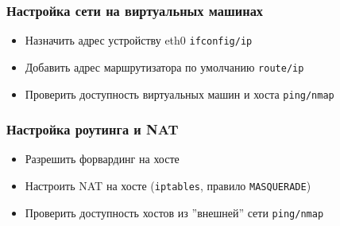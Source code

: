 \begin{frame}
	\frametitle{Настройка сети на виртуальных машинах}
			\begin{itemize}
				\item Назначить адрес устройству eth0 {\tt ifconfig/ip}
				\item Добавить адрес маршрутизатора по умолчанию {\tt route/ip}
				\item Проверить доступность виртуальных машин и хоста {\tt ping/nmap}
			\end{itemize}
\end{frame}

\begin{frame}
	\frametitle{Настройка роутинга и NAT}
			\begin{itemize}
				\item Разрешить форвардинг на хосте
				\item Настроить NAT на хосте ({\tt iptables},  правило {\tt MASQUERADE})
				\item Проверить доступность хостов из ''внешней'' сети {\tt ping/nmap}
			\end{itemize}
\end{frame}


